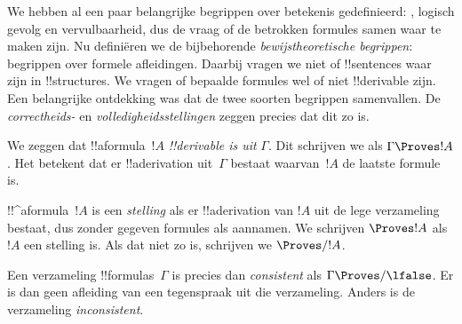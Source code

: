 \documentclass[openany]{memoir}
\begin{document}
\begingroup
\def\olfilename{OLP-0118}
\def\olfilepath{content/first-order-logic/axiomatic-deduction/}
\hypertarget{unit-OLP-0118}{}



      {}
      {}


\begin{explain}
We hebben al een paar belangrijke begrippen over betekenis
gedefinieerd: , logisch gevolg en
vervulbaarheid, dus de vraag of de betrokken formules samen waar te
maken zijn. Nu definiëren we de bijbehorende
\emph{bewijstheoretische begrippen}: begrippen over formele
afleidingen. Daarbij vragen we niet of !!{sentence}s waar zijn in
!!{structure}s. We vragen of bepaalde formules wel of niet
!!{derivable} zijn. Een belangrijke ontdekking was dat de twee soorten
begrippen samenvallen. De \emph{correctheids-} en
\emph{volledigheidsstellingen} zeggen precies dat dit zo is.
\end{explain}

\begin{defn}[!!^{derivability}]
We zeggen dat !!a{formula}~$!A$ \emph{!!{derivable} is uit} $\Gamma$.
Dit schrijven we als $\Gamma \Proves !A$. Het betekent dat er
!!a{derivation} uit~$\Gamma$ bestaat waarvan~$!A$ de laatste formule
is.
\end{defn}

\begin{defn}[Stellingen]
!!^a{formula}~$!A$ is een \emph{stelling} als er !!a{derivation} van
$!A$ uit de lege verzameling bestaat, dus zonder gegeven formules als
aannamen. We schrijven $\Proves !A$ als $!A$ een stelling is. Als dat
niet zo is, schrijven we $\Proves/ !A$.
\end{defn}

\begin{defn}[Consistentie]
Een verzameling !!{formula}s~$\Gamma$ is precies dan
\emph{consistent} als $\Gamma\Proves/ \lfalse$. Er is dan geen
afleiding van een tegenspraak uit die verzameling. Anders is de
verzameling \emph{inconsistent}.
\end{defn}
\end{document}
